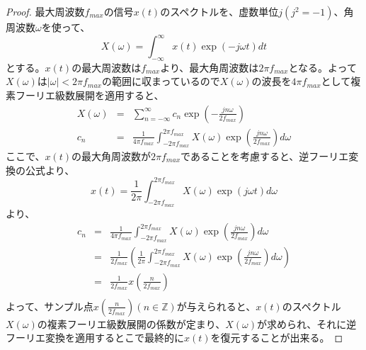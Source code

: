 \documentclass[a4paper]{jsarticle}
\begin{document}
\begin{proof}
最大周波数$ f_{max} $の信号$ x \left( t \right) $のスペクトルを、虚数単位$ j \left( j^2 = -1 \right) $、角周波数$ \omega $を使って、
\begin{equation}
X \left( \omega \right) = \int _{ - \infty } ^\infty x \left( t \right) \exp \left( -j \omega t \right) dt
\end{equation}
とする。$x \left( t \right) $の最大周波数は$ f_{max} $より、最大角周波数は$ 2 \pi f_{max} $となる。よって$ X \left( \omega \right) $は$ | \omega | < 2 \pi f_{max} $の範囲に収まっているので$ X \left( \omega \right) $の波長を$ 4 \pi f_{max} $として複素フーリエ級数展開を適用すると、
\begin{eqnarray}
	X \left( \omega \right) & = & \sum _{ n = - \infty } ^\infty c_n \exp \left( - \frac { jn \omega } { 2 f_{max} } \right) \nonumber \\
	c_n & = & \frac { 1 } { 4 \pi f_{max} } \int _{ -2 \pi f_{max} } ^{ 2 \pi f_{max} } X \left( \omega \right) \exp \left( \frac { jn \omega } { 2 f_{max} } \right) d \omega
\end{eqnarray}
ここで、$ x \left( t \right) $の最大角周波数が$ 2 \pi f_{max} $であることを考慮すると、逆フーリエ変換の公式より、
\begin{equation}
x \left( t \right) = \frac { 1 } { 2 \pi } \int _{ -2 \pi f_{max} } ^{ 2 \pi f_{max} } X \left( \omega \right) \exp \left( j \omega t \right) d \omega
\end{equation}
より、
\begin{eqnarray}
	c_n & = & \frac { 1 } { 4 \pi f_{max} } \int _{ -2 \pi f_{max} } ^{ 2 \pi f_{max} } X \left( \omega \right) \exp \left( \frac { jn \omega } { 2 f_{max} } \right) d \omega \nonumber \\
	& = & \frac { 1 } { 2 f_{max} } \left( \frac { 1 } { 2 \pi } \int _{ -2 \pi f_{max} } ^{ 2 \pi f_{max} } X \left( \omega \right) \exp \left( \frac { jn \omega } { 2 f_{max} } \right) d \omega \right) \nonumber \\
	& = & \frac { 1 } { 2 f_{max} } x \left( \frac { n } { 2 f_{max} } \right) \nonumber \\
\end{eqnarray}
よって、サンプル点$ x \left( \frac { n } { 2 f_{max} } \right) \left( n \in \mathbb{Z} \right) $が与えられると、$ x \left( t \right) $のスペクトル$ X \left( \omega \right) $の複素フーリエ級数展開の係数が定まり、$ X \left( \omega \right) $が求められ、それに逆フーリエ変換を適用するとこで最終的に$ x \left( t \right) $を復元することが出来る。
\end{proof}
\end{document}
